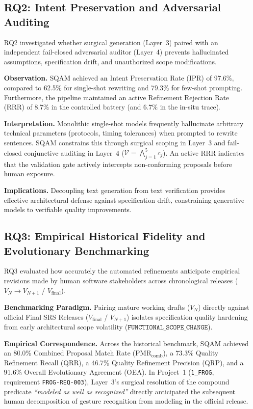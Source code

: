 \documentclass[journal]{IEEEtran}
\begin{document}
\subsection{RQ2: Intent Preservation and Adversarial Auditing}
\label{sec:discussion-rq2}

RQ2 investigated whether surgical generation (Layer~3) paired with an independent fail-closed adversarial auditor (Layer~4) prevents hallucinated assumptions, specification drift, and unauthorized scope modifications.

\textbf{Observation.} SQAM achieved an Intent Preservation Rate (IPR) of 97.6\%, compared to 62.5\% for single-shot rewriting and 79.3\% for few-shot prompting. Furthermore, the pipeline maintained an active Refinement Rejection Rate (RRR) of 8.7\% in the controlled battery (and 6.7\% in the in-situ trace).

\textbf{Interpretation.} Monolithic single-shot models frequently hallucinate arbitrary technical parameters (protocols, timing tolerances) when prompted to rewrite sentences. SQAM constrains this through surgical scoping in Layer~3 and fail-closed conjunctive auditing in Layer~4 ($\mathcal{V} = \bigwedge_{j=1}^5 c_j$). An active RRR indicates that the validation gate actively intercepts non-conforming proposals before human exposure.

\textbf{Implications.} Decoupling text generation from text verification provides effective architectural defense against specification drift, constraining generative models to verifiable quality improvements.

\subsection{RQ3: Empirical Historical Fidelity and Evolutionary Benchmarking}
\label{sec:discussion-rq3}

RQ3 evaluated how accurately the automated refinements anticipate empirical revisions made by human software stakeholders across chronological releases ($V_N \to V_{N+1}$ / $V_{\text{final}}$).

\textbf{Benchmarking Paradigm.} Pairing mature working drafts ($V_N$) directly against official Final SRS Releases ($V_{\text{final}}$ / $V_{N+1}$) isolates specification quality hardening from early architectural scope volatility ($\texttt{FUNCTIONAL\_SCOPE\_CHANGE}$).

\textbf{Empirical Correspondence.} Across the historical benchmark, SQAM achieved an 80.0\% Combined Proposal Match Rate ($\text{PMR}_{\text{comb}}$), a 73.3\% Quality Refinement Recall (QRR), a 46.7\% Quality Refinement Precision (QRP), and a 91.6\% Overall Evolutionary Agreement (OEA). In Project~1 (\texttt{1\_FROG}, requirement \texttt{FROG-REQ-003}), Layer~3's surgical resolution of the compound predicate \textit{``modeled as well as recognized''} directly anticipated the subsequent human decomposition of gesture recognition from modeling in the official release.
\end{document}
